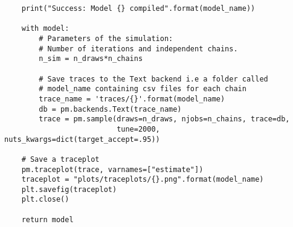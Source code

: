 \documentclass[a4paper]{article}
\begin{document}
\begin{verbatim}
    print("Success: Model {} compiled".format(model_name))

    with model:
        # Parameters of the simulation:
        # Number of iterations and independent chains.
        n_sim = n_draws*n_chains

        # Save traces to the Text backend i.e a folder called
        # model_name containing csv files for each chain
        trace_name = 'traces/{}'.format(model_name)
        db = pm.backends.Text(trace_name)
        trace = pm.sample(draws=n_draws, njobs=n_chains, trace=db,
                          tune=2000, nuts_kwargs=dict(target_accept=.95))
    
    # Save a traceplot 
    pm.traceplot(trace, varnames=["estimate"])
    traceplot = "plots/traceplots/{}.png".format(model_name)
    plt.savefig(traceplot)
    plt.close()
       
    return model
    
\end{verbatim}
\end{document}
